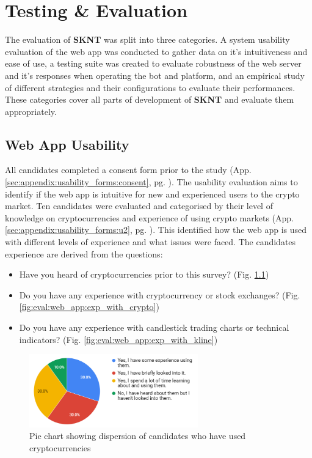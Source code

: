 %
\chapter{Testing \& Evaluation}
\label{sec:evaluation}

The evaluation of \textbf{SKNT} was split into three categories. A system usability evaluation of the web app was conducted to gather data on it's intuitiveness and ease of use, a testing suite was created to evaluate robustness of the web server and it's responses when operating the bot and platform, and an empirical study of different strategies and their configurations to evaluate their performances. These categories cover all parts of development of \textbf{SKNT} and evaluate them appropriately.


\section{Web App Usability}
\label{sec:evaluation:ui}
\noindent All candidates completed a consent form prior to the study (App. \ref{sec:appendix:usability_forms:consent}, pg. \pageref{sec:appendix:usability_forms:consent}). The usability evaluation aims to identify if the web app is intuitive for new and experienced users to the crypto market. Ten candidates were evaluated and categorised by their level of knowledge on cryptocurrencies and experience of using crypto markets (App. \ref{sec:appendix:usability_forms:u2}, pg. \pageref{sec:appendix:usability_forms:u2}). This identified how the web app is used with different levels of experience and what issues were faced. The candidates experience are derived from the questions:
\begin{itemize}
	\item Have you heard of cryptocurrencies prior to this survey? (Fig. \ref{fig:eval:web_app:heard_of_crypto})
    \item Do you have any experience with cryptocurrency or stock exchanges? (Fig. \ref{fig:eval:web_app:exp_with_crypto})
    \item Do you have any experience with candlestick trading charts or technical indicators? (Fig. \ref{fig:eval:web_app:exp_with_kline})
\end{itemize}


  \begin{figure}[ht]
  \centering
 \includegraphics[width=0.65\textwidth]{content/graphics/heard_of_crypto.PNG}
  \caption{Pie chart showing dispersion of candidates who have used cryptocurrencies}
  \label{fig:eval:web_app:heard_of_crypto}
\end{figure}

